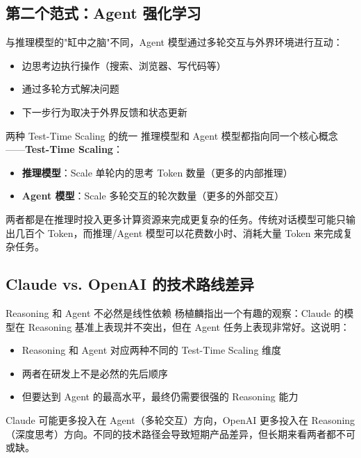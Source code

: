 \documentclass[a4paper]{article}
\begin{document}
\subsection{第二个范式：Agent 强化学习}

与推理模型的"缸中之脑"不同，Agent 模型通过多轮交互与外界环境进行互动：

\begin{itemize}
    \item 边思考边执行操作（搜索、浏览器、写代码等）
    \item 通过多轮方式解决问题
    \item 下一步行为取决于外界反馈和状态更新
\end{itemize}

\begin{importantbox}{两种 Test-Time Scaling 的统一}
推理模型和 Agent 模型都指向同一个核心概念——\textbf{Test-Time Scaling}：
\begin{itemize}
    \item \textbf{推理模型}：Scale 单轮内的思考 Token 数量（更多的内部推理）
    \item \textbf{Agent 模型}：Scale 多轮交互的轮次数量（更多的外部交互）
\end{itemize}
两者都是在推理时投入更多计算资源来完成更复杂的任务。传统对话模型可能只输出几百个 Token，而推理/Agent 模型可以花费数小时、消耗大量 Token 来完成复杂任务。
\end{importantbox}

\subsection{Claude vs. OpenAI 的技术路线差异}

\begin{knowledgebox}{Reasoning 和 Agent 不必然是线性依赖}
杨植麟指出一个有趣的观察：Claude 的模型在 Reasoning 基准上表现并不突出，但在 Agent 任务上表现非常好。这说明：
\begin{itemize}
    \item Reasoning 和 Agent 对应两种不同的 Test-Time Scaling 维度
    \item 两者在研发上不是必然的先后顺序
    \item 但要达到 Agent 的最高水平，最终仍需要很强的 Reasoning 能力
\end{itemize}
Claude 可能更多投入在 Agent（多轮交互）方向，OpenAI 更多投入在 Reasoning（深度思考）方向。不同的技术路径会导致短期产品差异，但长期来看两者都不可或缺。
\end{knowledgebox}
\end{document}
